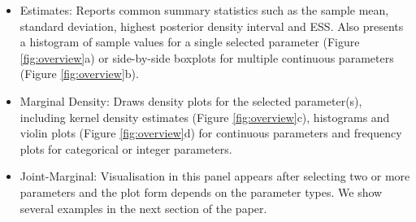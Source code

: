 \documentclass[webpdf,mynatbib,nosurname,nogrid,noCE,noMSC]{SYS}
\begin{document}
\begin{itemize}[leftmargin=*]
\vspace{-0.5em}
\item Estimates: Reports common summary statistics such as the sample mean, standard deviation, highest posterior density interval and ESS.  Also presents a histogram of sample values for a single selected parameter (Figure \ref{fig:overview}a) or  side-by-side boxplots for multiple continuous parameters (Figure \ref{fig:overview}b).
\item Marginal Density: Draws density plots for the selected parameter(s), including  kernel density estimates (Figure \ref{fig:overview}c), histograms and violin plots (Figure \ref{fig:overview}d) for continuous parameters and frequency plots for categorical or integer parameters.
\vspace*{-0.25em}
\item Joint-Marginal: Visualisation in this panel appears after selecting two or more parameters and the plot form depends on the parameter types. We show several examples in the next section of the paper.
%
\begin{figure}[t]
 \\
\\

\end{figure}
\end{itemize}
\end{document}
